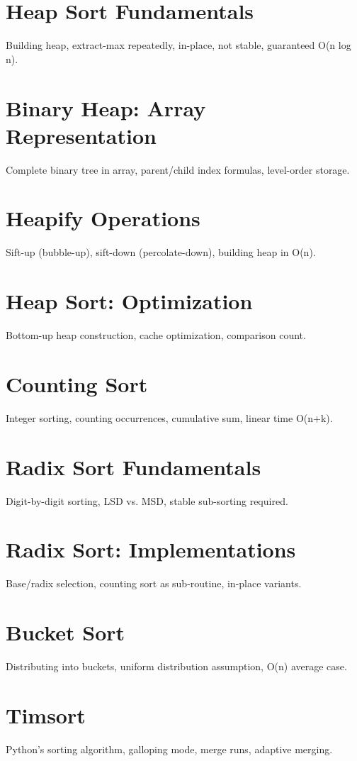 \chapter{Heap Sort Fundamentals}
Building heap, extract-max repeatedly, in-place, not stable, guaranteed O(n log n).

\chapter{Binary Heap: Array Representation}
Complete binary tree in array, parent/child index formulas, level-order storage.

\chapter{Heapify Operations}
Sift-up (bubble-up), sift-down (percolate-down), building heap in O(n).

\chapter{Heap Sort: Optimization}
Bottom-up heap construction, cache optimization, comparison count.

\chapter{Counting Sort}
Integer sorting, counting occurrences, cumulative sum, linear time O(n+k).

\chapter{Radix Sort Fundamentals}
Digit-by-digit sorting, LSD vs. MSD, stable sub-sorting required.

\chapter{Radix Sort: Implementations}
Base/radix selection, counting sort as sub-routine, in-place variants.

\chapter{Bucket Sort}
Distributing into buckets, uniform distribution assumption, O(n) average case.

\chapter{Timsort}
Python's sorting algorithm, galloping mode, merge runs, adaptive merging.

